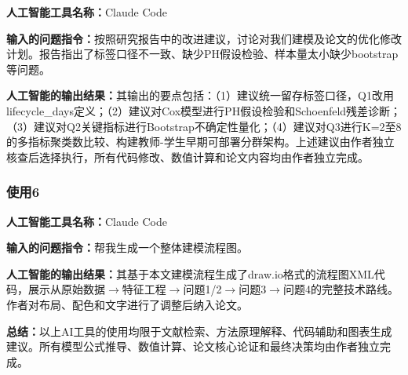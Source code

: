 \textbf{人工智能工具名称：}Claude Code

\textbf{输入的问题指令：}按照研究报告中的改进建议，讨论对我们建模及论文的优化修改计划。报告指出了标签口径不一致、缺少PH假设检验、样本量太小缺少bootstrap等问题。

\textbf{人工智能的输出结果：}其输出的要点包括：（1）建议统一留存标签口径，Q1改用lifecycle\_days定义；（2）建议对Cox模型进行PH假设检验和Schoenfeld残差诊断；（3）建议对Q2关键指标进行Bootstrap不确定性量化；（4）建议对Q3进行K=2至8的多指标聚类数比较、构建教师-学生早期可部署分群架构。上述建议由作者独立核查后选择执行，所有代码修改、数值计算和论文内容均由作者独立完成。

\subsubsection{使用6}

\textbf{人工智能工具名称：}Claude Code

\textbf{输入的问题指令：}帮我生成一个整体建模流程图。

\textbf{人工智能的输出结果：}其基于本文建模流程生成了draw.io格式的流程图XML代码，展示从原始数据$\to$特征工程$\to$问题1/2$\to$问题3$\to$问题4的完整技术路线。作者对布局、配色和文字进行了调整后纳入论文。

\textbf{总结：}以上AI工具的使用均限于文献检索、方法原理解释、代码辅助和图表生成建议。所有模型公式推导、数值计算、论文核心论证和最终决策均由作者独立完成。



